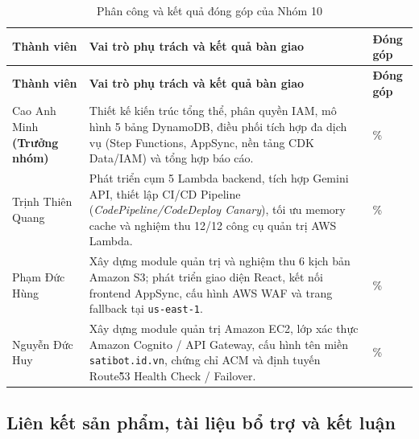 \documentclass[a4paper,12pt]{article}
\newcommand{\code}[1]{\texttt{#1}}
\begin{document}
\begin{longtable}{@{}
    >{\raggedright\arraybackslash}p{4.0cm}
    >{\raggedright\arraybackslash}p{\dimexpr\linewidth-6.3cm-4\tabcolsep\relax}
    >{\centering\arraybackslash}p{2.3cm}
    @{}}

\caption{Phân công và kết quả đóng góp của Nhóm 10}
\label{tab:team-roles}\\

\toprule
\textbf{Thành viên} &
\textbf{Vai trò phụ trách và kết quả bàn giao} &
\textbf{Đóng góp} \\
\midrule
\endfirsthead

\toprule
\textbf{Thành viên} &
\textbf{Vai trò phụ trách và kết quả bàn giao} &
\textbf{Đóng góp} \\
\midrule
\endhead

\endfoot
\bottomrule
\endlastfoot

Cao Anh Minh \textbf{(Trưởng nhóm)} &
Thiết kế kiến trúc tổng thể, phân quyền IAM,
mô hình 5 bảng DynamoDB, điều phối tích hợp đa dịch vụ
(Step Functions, AppSync, nền tảng CDK Data/IAM)
và tổng hợp báo cáo. &
25\% \\

Trịnh Thiên Quang &
Phát triển cụm 5 Lambda backend, tích hợp Gemini API,
thiết lập CI/CD Pipeline
(\textit{CodePipeline/CodeDeploy Canary}),
tối ưu memory cache và nghiệm thu 12/12
công cụ quản trị AWS Lambda. &
25\% \\

Phạm Đức Hùng &
Xây dựng module quản trị và nghiệm thu 6 kịch bản
Amazon S3; phát triển giao diện React,
kết nối frontend AppSync, cấu hình AWS WAF
và trang fallback tại \code{us-east-1}. &
25\% \\

Nguyễn Đức Huy &
Xây dựng module quản trị Amazon EC2,
lớp xác thực Amazon Cognito / API Gateway,
cấu hình tên miền \code{satibot.id.vn},
chứng chỉ ACM và định tuyến
Route\~53 Health Check / Failover. &
25\% \\

\end{longtable}
\endgroup

\subsection{Liên kết sản phẩm, tài liệu bổ trợ và kết luận}
\end{document}
